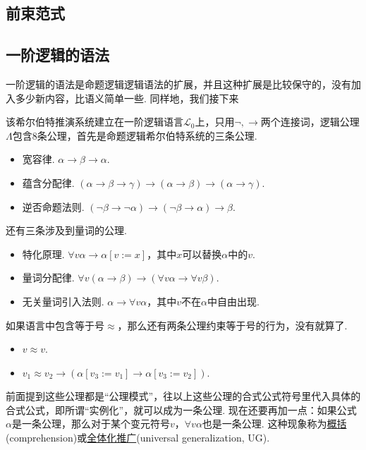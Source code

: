 \subsection{前束范式}

\subsection{一阶逻辑的语法}

一阶逻辑的语法是命题逻辑逻辑语法的扩展，并且这种扩展是比较保守的，没有加入多少新内容，比语义简单一些. 同样地，我们接下来

该希尔伯特推演系统建立在一阶逻辑语言\(\mathcal{L}_0\)上，只用\(\neg, \to\)两个连接词，逻辑公理\(\Lambda\)包含8条公理，首先是命题逻辑希尔伯特系统的三条公理.
\begin{itemize}
    \item [(A1)] 宽容律. \(\alpha \to \beta \to \alpha\).
    \item [(A2)] 蕴含分配律. \((\alpha \to \beta \to \gamma) \to (\alpha \to \beta) \to (\alpha \to \gamma)\).
    \item [(A3)] 逆否命题法则. \((\neg \beta \to \neg \alpha) \to (\neg \beta \to \alpha) \to \beta\).
\end{itemize}
还有三条涉及到量词的公理.
\begin{itemize}
    \item [(Q1)] 特化原理. \(\forall v \alpha \to \alpha[v:=x]\)，其中\(x\)可以替换\(\alpha\)中的\(v\).
    \item [(Q2)] 量词分配律. \(\forall v(\alpha \to \beta) \to (\forall v \alpha \to \forall v \beta)\).
    \item [(Q3)] 无关量词引入法则. \(\alpha \to \forall v \alpha\)，其中\(v\)不在\(\alpha\)中自由出现.
\end{itemize}
如果语言中包含等于号\(\approx\)，那么还有两条公理约束等于号的行为，没有就算了.
\begin{itemize}
    \item [(E1)] \(v \approx v\).
    \item [(E2)] \(v_1 \approx v_2 \to (\alpha[v_3:=v_1] \to \alpha[v_3:=v_2])\).
\end{itemize}

前面提到这些公理都是“公理模式”，往以上这些公理的合式公式符号里代入具体的合式公式，即所谓“实例化”，就可以成为一条公理. 现在还要再加一点：如果公式\(\alpha\)是一条公理，那么对于某个变元符号\(v\)，\(\forall v\alpha\)也是一条公理. 这种现象称为\underline{概括}(comprehension)或\underline{全体化推广}(universal generalization, UG).

